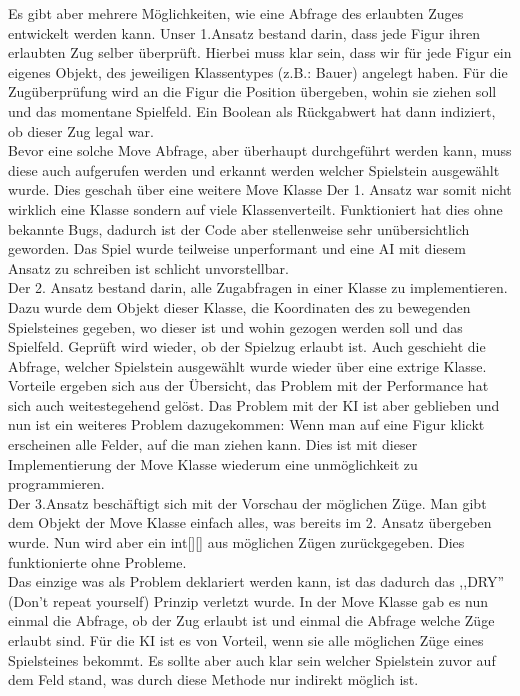 \documentclass[12pt,a4paper]{article}
\begin{document}
{Es gibt aber mehrere Möglichkeiten, wie eine Abfrage des erlaubten Zuges entwickelt werden kann. Unser 1.Ansatz bestand darin, dass jede Figur ihren erlaubten Zug selber überprüft. Hierbei muss klar sein, dass wir für jede Figur ein eigenes Objekt, des jeweiligen Klassentypes (z.B.: Bauer) angelegt haben. Für die Zugüberprüfung wird an die Figur die Position übergeben, wohin sie ziehen soll und das momentane Spielfeld. Ein Boolean als Rückgabwert hat dann indiziert, ob dieser Zug legal war. \\
Bevor eine solche Move Abfrage, aber überhaupt durchgeführt werden kann, muss diese auch aufgerufen werden und erkannt werden welcher Spielstein ausgewählt wurde. Dies geschah über eine weitere Move Klasse
Der 1. Ansatz war somit nicht wirklich eine Klasse sondern auf viele Klassenverteilt. Funktioniert hat dies ohne bekannte Bugs, dadurch ist der Code aber stellenweise sehr unübersichtlich geworden. Das Spiel wurde teilweise unperformant und eine AI mit diesem Ansatz zu schreiben ist schlicht unvorstellbar. \\[2ex]
Der 2. Ansatz bestand darin, alle Zugabfragen in einer Klasse zu implementieren. Dazu wurde dem Objekt dieser Klasse, die Koordinaten des zu bewegenden Spielsteines gegeben, wo dieser ist und wohin gezogen werden soll und das Spielfeld. Geprüft wird wieder, ob der Spielzug erlaubt ist. Auch geschieht die Abfrage, welcher Spielstein ausgewählt wurde wieder über eine extrige Klasse.\\ 
Vorteile ergeben sich aus der Übersicht, das Problem mit der Performance hat sich auch weitestegehend gelöst. Das Problem mit der KI ist aber geblieben und nun ist ein weiteres Problem dazugekommen: Wenn man auf eine Figur klickt erscheinen alle Felder, auf die man ziehen kann. Dies ist mit dieser Implementierung der Move Klasse wiederum eine unmöglichkeit zu programmieren.\\[2ex]
Der 3.Ansatz beschäftigt sich mit der Vorschau der möglichen Züge. Man gibt dem Objekt der Move Klasse einfach alles, was bereits im 2. Ansatz übergeben wurde. Nun wird aber ein int[][] aus möglichen Zügen zurückgegeben. Dies funktionierte ohne Probleme. \\
Das einzige was als Problem deklariert werden kann, ist das dadurch das ,,DRY'' (Don't repeat yourself) Prinzip verletzt wurde. In der Move Klasse gab es nun einmal die Abfrage, ob der Zug erlaubt ist und einmal die Abfrage welche Züge erlaubt sind. Für die KI ist es von Vorteil, wenn sie alle möglichen Züge eines Spielsteines bekommt. Es sollte aber auch klar sein welcher Spielstein zuvor auf dem Feld stand, was durch diese Methode nur indirekt möglich ist. \\[2ex]
}
\end{document}
